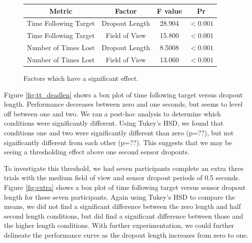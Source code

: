 \documentclass{acmsiggraph}                     %
\begin{document}
\begin{figure}[h]
\centering
\begin{tabular}{|c|c|c|c|}
\hline
Metric & Factor & F value & Pr \\
\hline
Time Following Target & Dropout Length & 28.904 & $<0.001$\\
Time Following Target & Field of View & 15.800 & $<0.001$\\
Number of Times Lost & Dropout Length & 8.5008 & $<0.001$\\
Number of Times Lost & Field of View & 13.060 & $<0.001$\\
\hline
\end{tabular}
 \caption{\label{fig:anova}Factors which have a significant effect.}
\end{figure}

Figure \ref{fig:tt_deadlen} shows a box plot of time following target versus dropout length.  Performance decreases between zero and one seconds, but seems to level off between one and two.  We ran a post-hoc analysis to determine which conditions were significantly different.  Using Tukey's HSD, we found that conditions one and two were significantly different than zero (p=??), but not significantly different from each other (p=??).  This suggests that we may be seeing a thresholding effect above one second sensor dropouts.

To investigate this threshold, we had seven participants complete an extra three trials with the medium field of view and sensor dropout periods of 0.5 seconds.  Figure \ref{fig:extra} shows a box plot of time following target versus sensor dropout length for these seven participants.  Again using Tukey's HSD to compare the means, we did not find a significant difference between the zero length and half second length conditions, but did find a significant difference between those and the higher length conditions.  
With further experimentation, we could further delineate the performance curve as the dropout length increases from zero to one.
\end{document}
